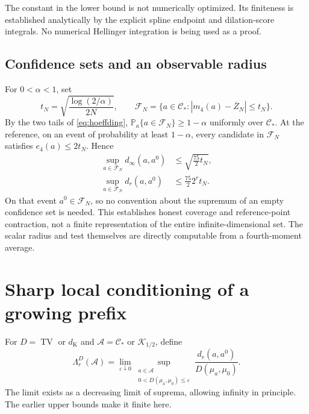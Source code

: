 \documentclass[11pt,a4paper]{article}
\numberwithin{equation}{section}
\theoremstyle{definition}
\theoremstyle{remark}
\DeclareMathOperator{\TV}{TV}
\newcommand{\PP}{\mathbb P}
\newcommand{\C}{\mathcal C}
\newcommand{\K}{\mathcal K}
\newcommand{\eps}{\varepsilon}
\newcommand{\dK}{d_{\mathrm K}}
\begin{document}
The constant in the lower bound is not numerically optimized. Its finiteness
is established analytically by the explicit spline endpoint and dilation-score
integrals. No numerical Hellinger integration is being used as a proof.

\subsection{Confidence sets and an observable radius}

For $0<\alpha<1$, set
\begin{equation}
 t_N=\sqrt{\frac{\log(2/\alpha)}{2N}},\qquad
 \mathcal F_N=\{a\in\C_*:|m_4(a)-\overline Z_N|\le t_N\}.
 \label{eq:confidence}
\end{equation}
By the two tails of \eqref{eq:hoeffding},
$\PP_a\{a\in\mathcal F_N\}\ge1-\alpha$ uniformly over $\C_*$.
At the reference, on an event of probability at least $1-\alpha$, every
candidate in $\mathcal F_N$ satisfies $e_4(a)\le2t_N$. Hence
\begin{align}
 \sup_{a\in\mathcal F_N}d_\infty(a,a^0)
 &\le\sqrt{\frac{75}{2}t_N}, \label{eq:confidence-global}\\
 \sup_{a\in\mathcal F_N}d_r(a,a^0)
 &\le\frac{75}{2}2^r t_N. \label{eq:confidence-prefix}
\end{align}
On that event $a^0\in\mathcal F_N$, so no convention about the supremum
of an empty confidence set is needed. This establishes honest coverage and
reference-point contraction, not a finite representation of the entire
infinite-dimensional set. The scalar radius and test themselves are directly
computable from a fourth-moment average.

\section{Sharp local conditioning of a growing prefix}
\label{sec:prefix}

For $D=\TV$ or $\dK$ and $\mathcal A=\C_*$ or $\K_{1/2}$, define
\begin{equation}
 \Lambda_r^D(\mathcal A)=\lim_{\eps\downarrow0}
 \sup_{\substack{a\in\mathcal A\\0<D(\mu_a,\mu_0)\le\eps}}
 \frac{d_r(a,a^0)}{D(\mu_a,\mu_0)}.
 \label{eq:prefix-constant}
\end{equation}
The limit exists as a decreasing limit of suprema, allowing infinity in
principle. The earlier upper bounds make it finite here.
\end{document}
